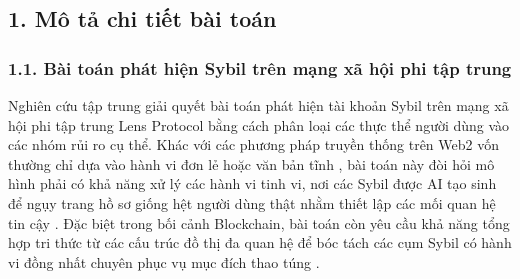\subsection{1. Mô tả chi tiết bài toán}
\subsubsection{1.1. Bài toán phát hiện Sybil trên mạng xã hội phi tập trung}
\indent\indent Nghiên cứu tập trung giải quyết bài toán phát hiện tài khoản Sybil trên mạng xã hội phi tập trung Lens Protocol bằng cách phân loại các thực thể người dùng vào các nhóm rủi ro cụ thể. Khác với các phương pháp truyền thống trên Web2 vốn thường chỉ dựa vào hành vi đơn lẻ hoặc văn bản tĩnh \cite{al2017sybil}, bài toán này đòi hỏi mô hình phải có khả năng xử lý các hành vi tinh vi, nơi các Sybil được AI tạo sinh để ngụy trang hồ sơ giống hệt người dùng thật nhằm thiết lập các mối quan hệ tin cậy \cite{heeb2024sybil}. Đặc biệt trong bối cảnh Blockchain, bài toán còn yêu cầu khả năng tổng hợp tri thức từ các cấu trúc đồ thị đa quan hệ để bóc tách các cụm Sybil có hành vi đồng nhất chuyên phục vụ mục đích thao túng \cite{liu2025detecting}.\vspace{0.3cm}

